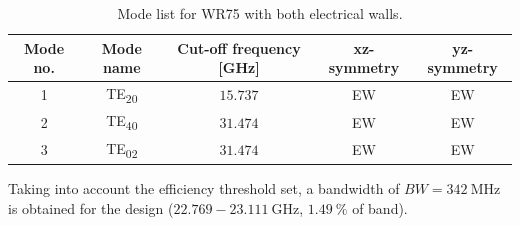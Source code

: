 \documentclass[english,twoside]{article}
\begin{document}
		\begin{table}[H]
			\centering
			\caption{Mode list for WR75 with both electrical walls.}
			\begin{tabular}{c|c|c|c|c}
				Mode no. & Mode name & Cut-off frequency [GHz] & xz-symmetry & yz-symmetry\\
				\hline
				1 & TE\textsubscript{20} & $\num{15.737}$ & EW & EW\\
				2 & TE\textsubscript{40} & $\num{31.474}$ & EW & EW\\
				3 & TE\textsubscript{02} & $\num{31.474}$ & EW & EW
			\end{tabular}
			\label{table:wr75_ee_modes}
		\end{table}
    
    Taking into account the efficiency threshold set, a bandwidth of $BW=\SI{342}{\mega\hertz}$ is obtained for the design ($\num{22.769}-\SI{23.111}{\giga\hertz}$, $\SI{1.49}{\percent}$ of band).
    
\end{document}
